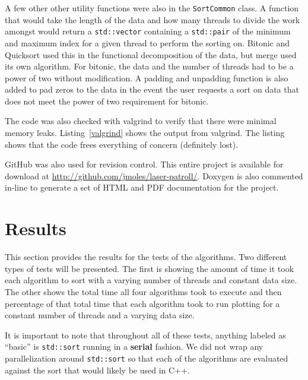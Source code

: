 \documentclass[journal]{IEEEtran}
\newcommand{\bashout}[2]{
\begin{figure}

\end{figure}
}
\begin{document}
A few other other utility functions were also in the \texttt{SortCommon} class. A function that would take the length of the data and how many threads to divide the work amongst would return a \texttt{std::vector} containing a \texttt{std::pair} of the minimum and maximum index for a given thread to perform the sorting on. Bitonic and Quicksort used this in the functional decomposition of the data, but merge used its own algorithm. For bitonic, the data and the number of threads had to be a power of two without modification. A padding and unpadding function is also added to pad zeros to the data in the event the user requests a sort on data that does not meet the power of two requirement for bitonic.

The code was also checked with valgrind to verify that there were minimal memory leaks. Listing~\ref{valgrind} shows the output from valgrind. The listing shows that the code frees everything of concern (definitely lost).

\bashout{valgrind}{Valgrind Output}

GitHub was also used for revision control. This entire project is available for download at \url{http://github.com/jmoles/laser-patroll/}. Doxygen is also commented in-line to generate a set of HTML and PDF documentation for the project.



\section{Results}
\label{sec:results}

This section provides the results for the tests of the algorithms. Two different types of tests will be presented. The first is showing the amount of time it took each algorithm to sort with a varying number of threads and constant data size. The other shows the total time all four algorithms took to execute and then percentage of that total time that each algorithm took to run plotting for a constant number of threads and a varying data size.

It is important to note that throughout all of these tests, anything labeled as ``basic'' is \texttt{std::sort} running in a \textbf{serial} fashion. We did not wrap any parallelization around \texttt{std::sort} so that each of the algorithms are evaluated against the sort that would likely be used in C++.
\end{document}
